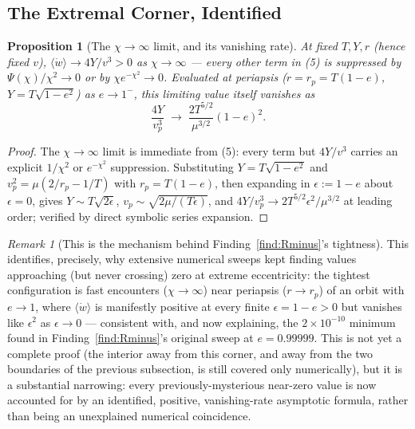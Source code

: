 \documentclass[12pt]{amsart}
\theoremstyle{plain}
\newtheorem{proposition}[theorem]{Proposition}
\theoremstyle{remark}
\newtheorem*{remark}{Remark}
\begin{document}
\subsection{The Extremal Corner, Identified}

\begin{proposition}[The $\chi\to\infty$ limit, and its vanishing rate]\label{prop:chiinf}
At fixed $T,Y,r$ (hence fixed $v$), $\langle\dot w\rangle\to4Y/v^3>0$ as $\chi\to\infty$ --- every other term in (5) is suppressed by $\Psi(\chi)/\chi^2\to0$ or by $\chi e^{-\chi^2}\to0$. Evaluated at periapsis ($r=r_p=T(1-e)$, $Y=T\sqrt{1-e^2}$) as $e\to1^-$, this limiting value itself vanishes as
\begin{equation}
\frac{4Y}{v_p^3} \;\longrightarrow\; \frac{2T^{5/2}}{\mu^{3/2}}(1-e)^2. \tag{6}
\end{equation}
\end{proposition}

\begin{proof}
The $\chi\to\infty$ limit is immediate from (5): every term but $4Y/v^3$ carries an explicit $1/\chi^2$ or $e^{-\chi^2}$ suppression. Substituting $Y=T\sqrt{1-e^2}$ and $v_p^2=\mu(2/r_p-1/T)$ with $r_p=T(1-e)$, then expanding in $\epsilon:=1-e$ about $\epsilon=0$, gives $Y\sim T\sqrt{2\epsilon}$, $v_p\sim\sqrt{2\mu/(T\epsilon)}$, and $4Y/v_p^3\to2T^{5/2}\epsilon^2/\mu^{3/2}$ at leading order; verified by direct symbolic series expansion.
\end{proof}

\begin{remark}[This is the mechanism behind Finding~\ref{find:Rminus}'s tightness]
This identifies, precisely, why extensive numerical sweeps kept finding values approaching (but never crossing) zero at extreme eccentricity: the tightest configuration is fast encounters ($\chi\to\infty$) near periapsis ($r\to r_p$) of an orbit with $e\to1$, where $\langle\dot w\rangle$ is manifestly positive at every finite $\epsilon=1-e>0$ but vanishes like $\epsilon^2$ as $\epsilon\to0$ --- consistent with, and now explaining, the $2\times10^{-10}$ minimum found in Finding~\ref{find:Rminus}'s original sweep at $e=0.99999$. This is not yet a complete proof (the interior away from this corner, and away from the two boundaries of the previous subsection, is still covered only numerically), but it is a substantial narrowing: every previously-mysterious near-zero value is now accounted for by an identified, positive, vanishing-rate asymptotic formula, rather than being an unexplained numerical coincidence.
\end{remark}
\end{document}
